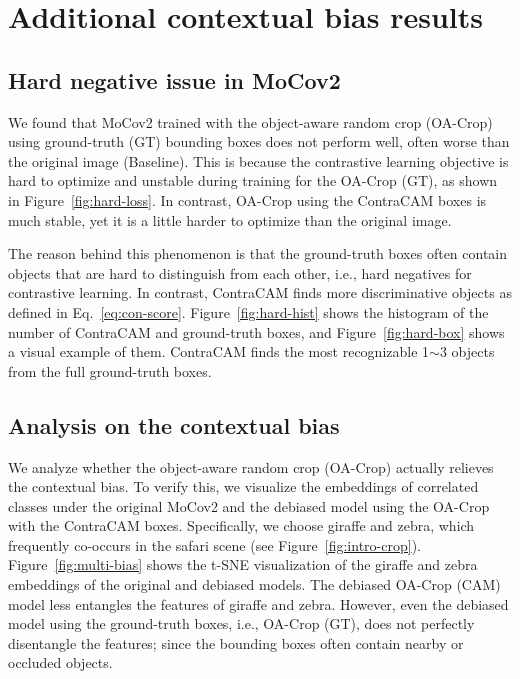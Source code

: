 \section{Additional contextual bias results}
\label{sec:add-multi}


\subsection{Hard negative issue in MoCov2}
\label{sec:add-multi-stability}

We found that MoCov2 trained with the object-aware random crop (OA-Crop) using ground-truth (GT) bounding boxes does not perform well, often worse than the original image (Baseline). This is because the contrastive learning objective is hard to optimize and unstable during training for the OA-Crop (GT), as shown in Figure~\ref{fig:hard-loss}. In contrast, OA-Crop using the ContraCAM boxes is much stable, yet it is a little harder to optimize than the original image.



The reason behind this phenomenon is that the ground-truth boxes often contain objects that are hard to distinguish from each other, i.e., hard negatives for contrastive learning. In contrast, ContraCAM finds more discriminative objects as defined in Eq.~\eqref{eq:con-score}. Figure~\ref{fig:hard-hist} shows the histogram of the number of ContraCAM and ground-truth boxes, and Figure~\ref{fig:hard-box} shows a visual example of them. ContraCAM finds the most recognizable 1$\sim$3 objects from the full ground-truth boxes.





\newpage
\subsection{Analysis on the contextual bias}
\label{sec:add-multi-bias}

We analyze whether the object-aware random crop (OA-Crop) actually relieves the contextual bias. To verify this, we visualize the embeddings of correlated classes under the original MoCov2 and the debiased model using the OA-Crop with the ContraCAM boxes. Specifically, we choose giraffe and zebra, which frequently co-occurs in the safari scene (see Figure~\ref{fig:intro-crop}). Figure~\ref{fig:multi-bias} shows the t-SNE \citep{van2008visualizing} visualization of the giraffe and zebra embeddings of the original and debiased models. The debiased OA-Crop (CAM) model less entangles the features of giraffe and zebra. However, even the debiased model using the ground-truth boxes, i.e., OA-Crop (GT), does not perfectly disentangle the features; since the bounding boxes often contain nearby or occluded objects.

